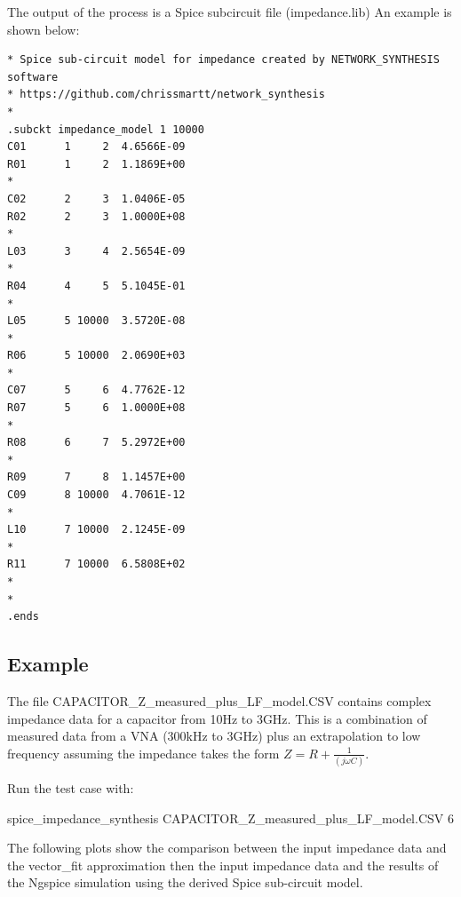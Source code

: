 The output of the process is a Spice subcircuit file (impedance.lib) An example is shown below:

\begin{verbatim}
* Spice sub-circuit model for impedance created by NETWORK_SYNTHESIS software
* https://github.com/chrissmartt/network_synthesis
* 
.subckt impedance_model 1 10000
C01      1     2  4.6566E-09
R01      1     2  1.1869E+00
*
C02      2     3  1.0406E-05
R02      2     3  1.0000E+08
*
L03      3     4  2.5654E-09
*
R04      4     5  5.1045E-01
*
L05      5 10000  3.5720E-08
*
R06      5 10000  2.0690E+03
*
C07      5     6  4.7762E-12
R07      5     6  1.0000E+08
*
R08      6     7  5.2972E+00
*
R09      7     8  1.1457E+00
C09      8 10000  4.7061E-12
*
L10      7 10000  2.1245E-09
*
R11      7 10000  6.5808E+02
*
*
.ends
\end{verbatim}

\subsection{Example}

The file CAPACITOR\_Z\_measured\_plus\_LF\_model.CSV contains complex impedance data for
a capacitor from 10Hz to 3GHz. This is a combination of measured data from a VNA (300kHz to 3GHz) plus an extrapolation to low frequency assuming the impedance takes the form $Z=R+\frac{1}{(j \omega C)}$.

\vspace{5mm}

Run the test case with:

\vspace{5mm}

spice\_impedance\_synthesis CAPACITOR\_Z\_measured\_plus\_LF\_model.CSV 6

\vspace{5mm}

The following plots show the comparison between the input impedance data and the vector\_fit approximation then the input impedance data and the results of the Ngspice simulation using the derived Spice sub-circuit model.

